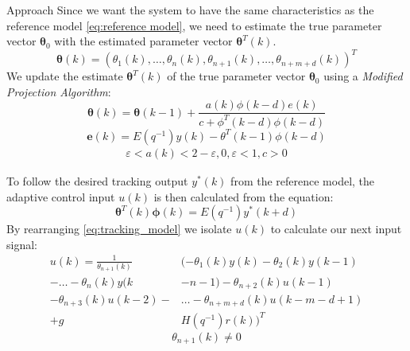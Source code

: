 \begin{section}{Approach}
Since we want the system to have the same characteristics as the reference model \eqref{eq:reference model}, we need to estimate the true parameter vector $\bm{\theta}_0$ with the estimated parameter vector $\bm{\theta}^T(k)$. 
    \begin{equation}
    \bm{\theta}(k)=(\theta_1(k), \dots ,\theta_n(k),\theta_{n+1}(k), \dots ,\theta_{n+m+d}(k))^T
	\end{equation}
We update the estimate $\bm{\theta}^T(k)$ of the true parameter vector $\bm{\theta}_0$ using a \textit{Modified Projection Algorithm}:
	\begin{equation}
	\label{eq:Modified_Proj_Algorithm}
	\bm{\theta}(k)=\bm{\theta}(k-1)+\frac{a(k)\phi(k-d)e(k)}{c+\phi^T(k-d)\phi(k-d)}
	\end{equation}
	\begin{equation}
	\bm{e}(k)=E(q^{-1})y(k)-\theta^T(k-1)\phi(k-d)
	\end{equation}
	\begin{align*}
	\varepsilon<a(k)<2-\varepsilon, 0,\varepsilon<1, c>0
	\end{align*}
	
To follow the desired tracking output $y^*(k)$ from the reference model, the adaptive control input $u(k)$ is then calculated from the equation:
    \begin{equation}
    \label{eq:tracking_model}
	\bm{\theta}^T(k)\bm{\phi}(k)=E(q^{-1})y^*(k+d)
	\end{equation}
By rearranging \eqref{eq:tracking_model} we isolate $u(k)$ to calculate our next input signal:
	\begin{align}
	u(k)=\frac{1}{\theta_{n+1}(k)}&(-\theta_1(k)y(k)-\theta_2(k)y(k-1)  \nonumber \\
    -\dots-\theta_n(k)y(k&-n-1)-\theta_{n+2}(k)u(k-1)  \\
	-\theta_{n+3}(k)u(k-2)-& \dots - \theta_{n+m+d}(k)u(k-m-d+1) \nonumber \\
	+g&H(q^{-1})r(k))^T \nonumber
	\end{align}
    \begin{equation}
	\theta_{n+1}(k)\neq0 \nonumber
	\end{equation}
	

\end{section}
